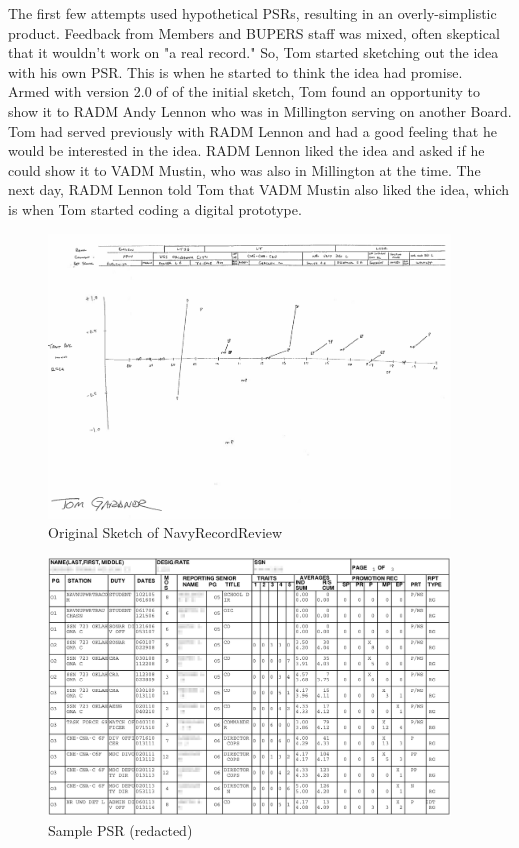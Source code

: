 \documentclass[UTF8]{article}
\begin{document}
The first few attempts used hypothetical PSRs, resulting in an overly-simplistic
product. Feedback from Members and BUPERS staff was mixed, often skeptical that
it wouldn't work on "a real record." So, Tom started sketching out the idea with
his own PSR. This is when he started to think the idea had promise.  \\

Armed with version 2.0 of of the initial sketch, Tom found an opportunity to 
show it to RADM Andy Lennon who was in Millington serving on another Board. Tom 
had served previously with RADM Lennon and had a good feeling that he would be
interested in the idea. RADM Lennon liked the idea and asked if he could show it
to VADM Mustin, who was also in Millington at the time. The next day, RADM Lennon
told Tom that VADM Mustin also liked the idea, which is when Tom started coding 
a digital prototype.  \\ 


\begin{figure}[h!]
 \centering
 \includegraphics[width=0.95\textwidth]{original_sketch.png}
 \caption{Original Sketch of NavyRecordReview}
\end{figure}


\begin{figure}[h!]
 \centering
 \includegraphics[width=0.95\textwidth]{blurred_psr.png}
 \caption{Sample PSR (redacted)}
\end{figure}
\end{document}
